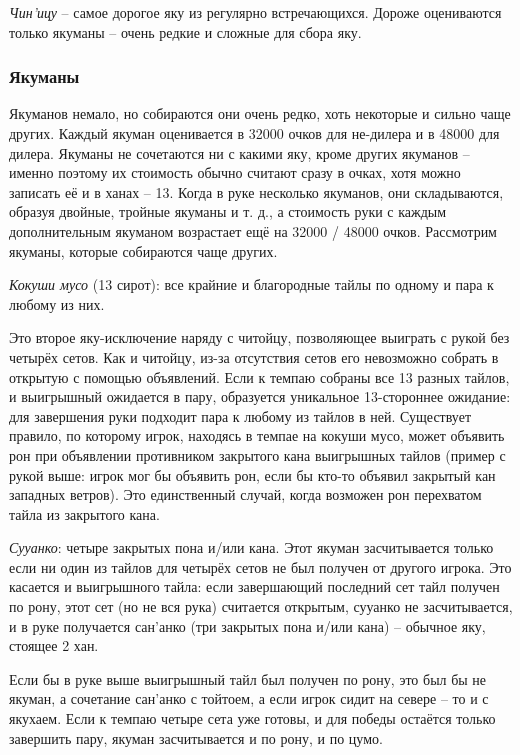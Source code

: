 \noindent{}

\textit{Чин'ицу} – самое дорогое яку из регулярно встречающихся. Дороже оцениваются только якуманы – очень редкие и сложные для сбора яку. 

\subsubsection{Якуманы}

Якуманов немало, но собираются они очень редко, хоть некоторые и сильно чаще других. Каждый якуман оценивается в 32000 очков для не-дилера и в 48000 для дилера. Якуманы не сочетаются ни с какими яку, кроме других якуманов – именно поэтому их стоимость обычно считают сразу в очках, хотя можно записать её и в ханах – 13. Когда в руке несколько якуманов, они складываются, образуя двойные, тройные якуманы и т. д., а стоимость руки с каждым дополнительным якуманом возрастает ещё на 32000 / 48000 очков. Рассмотрим якуманы, которые собираются чаще других.

\textit{Кокуши мусо} (13 сирот): все крайние и благородные тайлы по одному и пара к любому из них.


Это второе яку-исключение наряду с читойцу, позволяющее выиграть с рукой без четырёх сетов. Как и читойцу, из-за отсутствия сетов его невозможно собрать в открытую с помощью объявлений. Если к темпаю собраны все 13 разных тайлов, и выигрышный ожидается в пару, образуется уникальное 13-стороннее ожидание: для завершения руки подходит пара к любому из тайлов в ней.  Существует правило, по которому игрок, находясь в темпае на кокуши мусо, может объявить рон при объявлении противником закрытого кана выигрышных тайлов (пример с рукой выше: игрок мог бы объявить рон, если бы кто-то объявил закрытый кан западных ветров). Это единственный случай, когда возможен рон перехватом тайла из закрытого кана.

\textit{Сууанко}: четыре закрытых пона и/или кана. Этот якуман засчитывается только если ни один из тайлов для четырёх сетов не был получен от другого игрока. Это касается и выигрышного тайла: если завершающий последний сет тайл получен по рону, этот сет (но не вся рука) считается открытым, сууанко не засчитывается, и в руке получается сан'анко (три закрытых пона и/или кана) – обычное яку, стоящее 2 хан. 


Если бы в руке выше выигрышный тайл был получен по рону, это был бы не якуман, а сочетание сан'анко с тойтоем, а если игрок сидит на севере – то и с якухаем. Если к темпаю четыре сета уже готовы, и для победы остаётся только завершить пару, якуман засчитывается и по рону, и по цумо.

